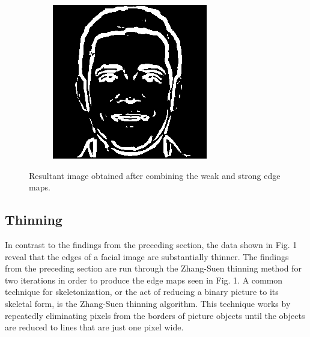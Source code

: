 \documentclass{70_styles/svproc}
\begin{document}
\begin{figure}
\begin{subfigure}[b]{0.2\textwidth}
     \end{subfigure}
     \begin{subfigure}[b]{0.2\textwidth}
         \centering
         \includegraphics[width=\textwidth]{70_figures/com-seed1830.png}
     \end{subfigure}
     \caption{Resultant image obtained after combining the weak and strong edge maps.}
\end{figure}

\subsection{Thinning}
In contrast to the findings from the preceding section, the data shown in Fig. 1 reveal that the edges of a facial image are substantially thinner. The findings from the preceding section are run through the Zhang-Suen thinning \cite{6223430} method for two iterations in order to produce the edge maps seen in Fig. 1. A common technique for skeletonization, or the act of reducing a binary picture to its skeletal form, is the Zhang-Suen thinning algorithm. This technique works by repeatedly eliminating pixels from the borders of picture objects until the objects are reduced to lines that are just one pixel wide. 
\end{document}

